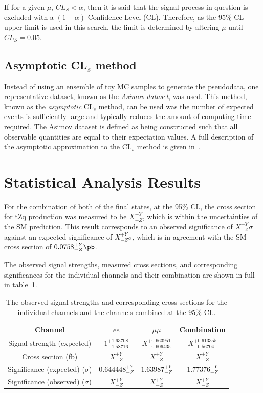 If for a given $\mu$, $CL_{S} < \alpha$, then it is said that the signal process in question is excluded with a $(1 - \alpha)$ Confidence Level (CL).
Therefore, as the 95\% CL upper limit is used in this search, the limit is determined by altering $\mu$  until $CL_{S} = 0.05$.

\subsection{Asymptotic CL$_{s}$ method}\label{subsec:asymptoticCLS}
Instead of using an ensemble of toy MC samples to generate the pseudodata, one representative dataset, known as the \emph{Asimov dataset}, was used.
This method, known as the \emph{asymptotic} CL$_{s}$ method, can be used was the number of expected events is sufficiently large and typically reduces the amount of computing time required.
The Asimov dataset is defined as being constructed such that all observable quantities are equal to their expectation values.
A full description of the asymptotic approximation to the CL$_{s}$ method is given in~\cite{Cowan:2010js}.

\section{Statistical Analysis Results}
For the combination of both of the final states, at the 95\% CL, the cross section for tZq production was measured to be $X^{+Y}_{-Z}$, which is within the uncertainties of the SM prediction.
This result corresponds to an observed significance of $X_{-Z}^{+Y} \sigma$ against an expected significance of $X_{-Z}^{+Y} \sigma$, which is in agreement with the SM cross section of  $0.0758^{+Y}_{-Z} \pb$.

The observed signal strengths, measured cross sections, and corresponding significances for the individual channels and their combination are shown in full in table~\ref{tab:shapetxs}.

\begin{table}[!h]
   \centering
   \caption{The observed signal strengths and corresponding cross sections for
   the individual channels and the channels combined at the 95\% CL.}
   \begin{tabular}{cccc}
       \hline
       Channel & $ee$ & $\mu\mu$ & \textbf{Combination} \\
        \hline
       Signal strength (expected) & $1_{-1.58716}^{+1.63708}$ & $X_{-0.606435}^{+0.663951}$ & $X_{-0.56704}^{+0.613355}$ \\
       Cross section (fb) & $X_{-Z}^{+Y}$ & $X_{-Z}^{+Y}$ & $X_{-Z}^{+Y}$ \\
       Significance (expected) ($\sigma$) & $0.644448_{-Z}^{+Y}$ & $1.63987_{-Z}^{+Y}$ & $1.77376_{-Z}^{+Y}$ \\
       Significance (observed) ($\sigma$) & $X_{-Z}^{+Y}$ & $X_{-Z}^{+Y}$ & $X_{-Z}^{+Y}$ \\
    \end{tabular}
   \label{tab:shapetxs}
\end{table}

